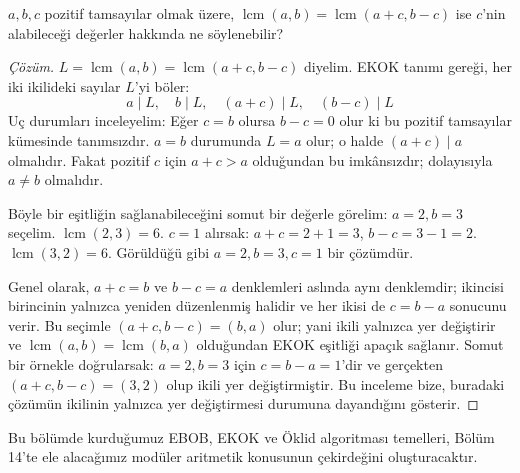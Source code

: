 \begin{example}
$a, b, c$ pozitif tamsayılar olmak üzere, $\operatorname{lcm}(a, b) = \operatorname{lcm}(a+c, b-c)$ ise $c$'nin alabileceği değerler hakkında ne söylenebilir?
\end{example}

\begin{proof}[Çözüm]
$L = \operatorname{lcm}(a, b) = \operatorname{lcm}(a+c, b-c)$ diyelim.
EKOK tanımı gereği, her iki ikilideki sayılar $L$'yi böler:
\[ a \mid L, \quad b \mid L, \quad (a+c) \mid L, \quad (b-c) \mid L \]
Uç durumları inceleyelim: Eğer $c = b$ olursa $b-c = 0$ olur ki bu pozitif tamsayılar kümesinde tanımsızdır.
$a = b$ durumunda $L = a$ olur; o halde $(a+c) \mid a$ olmalıdır. Fakat pozitif $c$ için $a+c > a$ olduğundan bu imkânsızdır; dolayısıyla $a \neq b$ olmalıdır.

Böyle bir eşitliğin sağlanabileceğini somut bir değerle görelim:
$a = 2, b = 3$ seçelim. $\operatorname{lcm}(2, 3) = 6$.
$c = 1$ alırsak:
$a+c = 2+1 = 3$, $b-c = 3-1 = 2$.
$\operatorname{lcm}(3, 2) = 6$.
Görüldüğü gibi $a = 2, b = 3, c = 1$ bir çözümdür.

Genel olarak, $a+c = b$ ve $b-c = a$ denklemleri aslında aynı denklemdir; ikincisi birincinin yalnızca yeniden düzenlenmiş halidir ve her ikisi de $c = b - a$ sonucunu verir. Bu seçimle $(a+c, b-c) = (b, a)$ olur; yani ikili yalnızca yer değiştirir ve $\operatorname{lcm}(a, b) = \operatorname{lcm}(b, a)$ olduğundan EKOK eşitliği apaçık sağlanır. Somut bir örnekle doğrularsak: $a=2, b=3$ için $c = b-a = 1$'dir ve gerçekten $(a+c, b-c) = (3, 2)$ olup ikili yer değiştirmiştir. Bu inceleme bize, buradaki çözümün ikilinin yalnızca yer değiştirmesi durumuna dayandığını gösterir.
\end{proof}

Bu bölümde kurduğumuz EBOB, EKOK ve Öklid algoritması temelleri, Bölüm 14'te ele alacağımız modüler aritmetik konusunun çekirdeğini oluşturacaktır.
